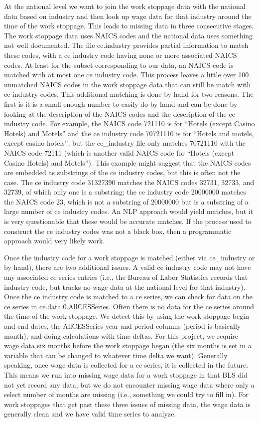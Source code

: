\documentclass[reqno,11pt]{amsart}
\begin{document}
At the national level we want to join the work stoppage data with the national data
based on industry and then look up wage data for that industry around the time of
the work stoppage. This leads to missing data in three consecutive stages.
The work stoppage data uses NAICS codes and the national data uses
something not well documented. The file ce.industry provides partial information
to match these codes, with a ce industry code having none or more associated 
NAICS codes. At least for the subset corresponding to our data, an NAICS code is matched
with at most one ce industry code. This process leaves a little over 100 unmatched 
NAICS codes in the work stoppage data that can still be match with ce industry codes.
This additional matching is done by hand for two reasons. The first is it is a small
enough number to easily do by hand and can be done by looking at the description
of the NAICS codes and the description of the ce industry code.
For example, the NAICS code 721110 is for 
``Hotels (except Casino Hotels) and Motels''
and the ce industry code 70721110 is for 
``Hotels and motels, except casino hotels'', but the ce\_industry
file only matches 70721110 with the NAICS code 72111
(which is another valid NAICS code for  ``Hotels (except Casino Hotels) and Motels'').
This example might suggest that the NAICS codes are embedded as substrings
of the ce industry codes, but this is often not the case. 
The ce industry code 31327390 matches the NAICS codes	
32731, 32733, and 32739, of which only one is a substring;
the ce industry code 20000000 matches the NAICS code 23, which is not a substring
of 20000000 but is a substring of a large number of ce industry codes.
An NLP approach would yield matches, but it is very questionable that these
would be accurate matches.
If the process used to construct the ce industry codes was not a black box,
then a programmatic approach would very likely work.

Once the industry code for a work stoppage is matched
(either via ce\_industry or by hand), there are two additional issues.
A valid ce industry code may not have any associated ce series entries
(i.e., the Bureau of Labor Statistics records that industry code, but 
tracks no wage data at the national level for that industry).
Once the ce industry code is matched to a ce series, we can check
for data on the ce series in ce.data.0.AllCESSeries.
Often there is no data for the ce series around the time of the
work stoppage. We detect this by using the work stoppage begin and end dates,
the AllCESSeries year and period columns (period is basically month), and 
doing calculations with time deltas. For this project, we require
wage data six months before the work stoppage began (the six months is set in a 
variable that can be changed to whatever time delta we want).
Generally speaking, once wage data is collected for a ce series, it
is collected in the future. This means we run into missing wage data for a work
stoppage in that BLS did not yet record any data, 
but we do not encounter missing wage data where only a select number of
months are missing (i.e., something we could try to fill in).
For work stoppages that get past these three issues of missing data, the 
wage data is generally clean and we have valid time series to analyze.
\end{document}
